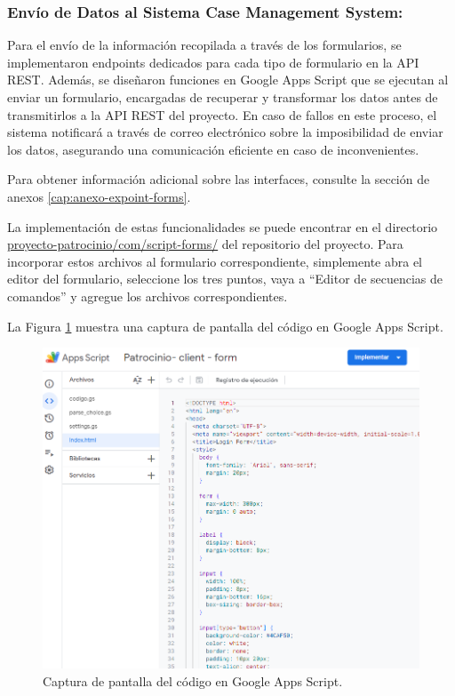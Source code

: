 \subsubsection{Envío de Datos al Sistema Case Management System:}

Para el envío de la información recopilada a través de los formularios, se implementaron endpoints dedicados para cada tipo de formulario en la API REST. Además, se diseñaron funciones en Google Apps Script que se ejecutan al enviar un formulario, encargadas de recuperar y transformar los datos antes de transmitirlos a la API REST del proyecto. En caso de fallos en este proceso, el sistema notificará a través de correo electrónico sobre la imposibilidad de enviar los datos, asegurando una comunicación eficiente en caso de inconvenientes.

Para obtener información adicional sobre las interfaces, consulte la sección de anexos \ref{cap:anexo-expoint-forms}.


La implementación de estas funcionalidades se puede encontrar en el directorio \href{https://github.com/proyecto-patrocinio/proyecto-patrocinio/tree/main/com/script-forms}{proyecto-patrocinio/com/script-forms/} del repositorio del proyecto. Para incorporar estos archivos al formulario correspondiente, simplemente abra el editor del formulario, seleccione los tres puntos, vaya a ``Editor de secuencias de comandos'' y agregue los archivos correspondientes.


La Figura \ref{fig:app-script-code} muestra una captura de pantalla del código en Google Apps Script.

\begin{figure}[H]
\centering
\includegraphics[width=0.75\linewidth]{fig/app-script-code.png}
\caption{Captura de pantalla del código en Google Apps Script.}
\label{fig:app-script-code}
\end{figure}

